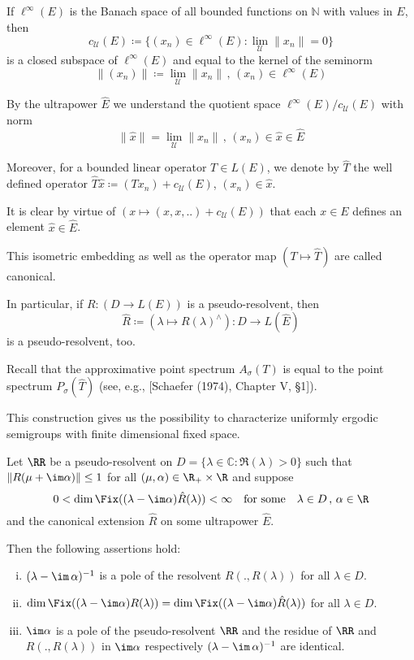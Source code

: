 If $\ell^{\infty}(E)$ is the Banach space of all bounded functions on $\mathbb{N}$ with values in $E$, then
\[
c_{\mathcal{U}}(E) \coloneqq \{(x_{n}) \in \ell^{\infty}(E) \colon \lim_{\mathcal{U}}\|x_{n}\| = 0\}
\]
is a closed subspace of $\ell^{\infty}(E)$ and equal to the kernel of the seminorm
\[
\|(x_{n})\| \coloneqq \lim_{\mathcal{U}}\|x_{n}\| \, , \, (x_{n}) \in \ell^{\infty}(E)
\]

By the ultrapower $\hat{E}$ we understand the quotient space $\ell^{\infty}(E)/c_{\mathcal{U}}(E)$ with norm
\[
\|\hat{x}\| = \lim_{\mathcal{U}}\|x_{n}\| \, , \, (x_{n}) \in \hat{x} \in \hat{E}
\]

Moreover, for a bounded linear operator $T \in L(E)$, we denote by $\hat{T}$ the well defined operator $\hat{T}\hat{x} \coloneqq (Tx_{n}) + c_{\mathcal{U}}(E)$, $(x_{n}) \in \hat{x}$.

It is clear by virtue of $(x \mapsto (x, x, ..) + c_{\mathcal{U}}(E))$ that each $x \in E$ defines an element $\hat{x} \in \hat{E}$.

This isometric embedding as well as the operator map $(T \mapsto \hat{T})$ are called canonical.

In particular, if $R: (D \to L(E))$ is a pseudo-resolvent, then
\[
\hat{R} \coloneqq (\lambda \mapsto R(\lambda)^{\wedge}): D \to L(\hat{E})
\]
is a pseudo-resolvent, too.

Recall that the approximative point spectrum $A_{\sigma}(T)$ is equal to the point spectrum $P_{\sigma}(\hat{T})$ (see, e.g., [Schaefer (1974), Chapter V, §1]).

This construction gives us the possibility to characterize uniformly ergodic semigroups with finite dimensional fixed space.

\begin{lemma}\label{lem:d3-2.2}
Let $\RR$ be a pseudo-resolvent on $D = \{\lambda \in \mathbb{C} \colon \Re(\lambda) > 0\}$ such that $\|R(\mu+\im\alpha)\| \leq 1$ for all $(\mu,\alpha) \in \R_{+} \times \R$ and suppose
\[
0 < \dim \Fix((\lambda-\im\alpha)\hat{R}(\lambda)) < \infty \quad \text{for some} \quad \lambda \in D \, , \, \alpha \in \R
\]
and the canonical extension $\hat{R}$ on some ultrapower $\hat{E}$.





Then the following assertions hold:

\begin{enumerate}[(i)]
\item $(\lambda - \im\,\alpha)^{-1}$ is a pole of the resolvent $R(.,R(\lambda))$ for all $\lambda \in D$.

\item $\dim \Fix((\lambda-\im\alpha)R(\lambda)) = \dim \Fix((\lambda-\im\alpha)\hat{R}(\lambda))$ for all $\lambda \in D$.

\item $\im\alpha$ is a pole of the pseudo-resolvent $\RR$ and the residue of $\RR$ and $R(.,R(\lambda))$ in $\im\alpha$ respectively $(\lambda - \im\,\alpha)^{-1}$ are identical.
\end{enumerate}
\end{lemma}

